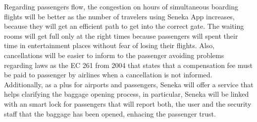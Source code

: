 \documentclass[12pt]{article}
\begin{document}
Regarding passengers flow, the congestion on hours of simultaneous boarding flights will be better as the number of travelers using Seneka App increases, because they will get an efficient path to get into the correct gate. The waiting rooms will get full only at the right times because passengers will spent their time in entertainment places without fear of losing their flights. Also, cancellations will be easier to inform  to the passenger avoiding problems regarding laws as the EC 261 from 2004 that states that a compensation fee must be paid to passenger by airlines when a cancellation is not informed.\\

Additionally, as a plus for airports and passengers, Seneka will offer a service that helps clarifying the baggage opening process, in particular, Seneka will be linked with an smart lock for passengers that will report both, the user and the security staff that the baggage has been opened, enhacing the passenger trust.\\  


\end{document}
